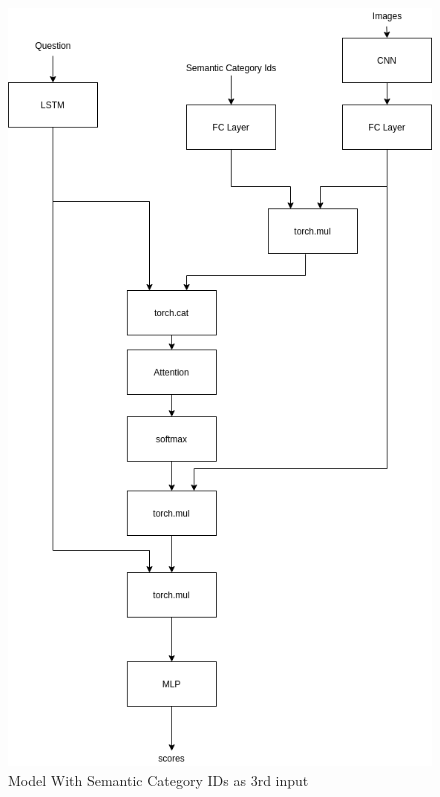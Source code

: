 \begin{figure}[h]
     \centering
     \includegraphics[width=.75\textwidth]{./figure/model_w_semantic.png}
     \caption{Model With Semantic Category IDs as 3rd input}
     \label{fig:category_model}
\end{figure}

